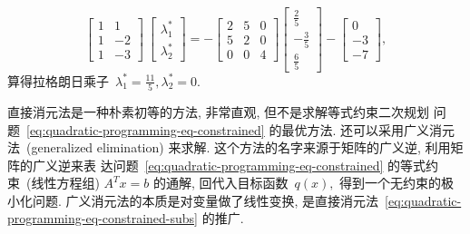 \begin{exam}
\begin{equation*}
\begin{bmatrix} 1 & 1 \\ 1 & -2 \\ 1 & -3 \end{bmatrix} ~ \begin{bmatrix} \lambda_1^* \\ \lambda_2^* \end{bmatrix} = - \begin{bmatrix} 2 & 5 & 0 \\ 5 & 2 & 0 \\ 0 & 0 & 4 \end{bmatrix} \begin{bmatrix} \frac{2}{5} \\ -\frac{3}{5} \\ \frac{6}{5} \end{bmatrix} - \begin{bmatrix} 0 \\ -3 \\ -7 \end{bmatrix},
\end{equation*}
算得拉格朗日乘子~$\lambda_1^* = \frac{11}{5}, \lambda_2^* = 0.$
\end{exam}

直接消元法是一种朴素初等的方法, 非常直观, 但不是求解等式约束二次规划
问题~\eqref{eq:quadratic-programming-eq-constrained} 的最优方法. 还可以采用广义消元法~(generalized elimination) 来求解. 这个方法的名字来源于矩阵的广义逆, 利用矩阵的广义逆来表
达问题~\eqref{eq:quadratic-programming-eq-constrained} 的等式约束~(线性方程组) $A^T {x} = {b}$ 的通解, 回代入目标函数~$q({x}),$ 得到一个无约束的极小化问题. 广义消元法的本质是对变量做了线性变换, 是直接消元法~\eqref{eq:quadratic-programming-eq-constrained-subs} 的推广.

